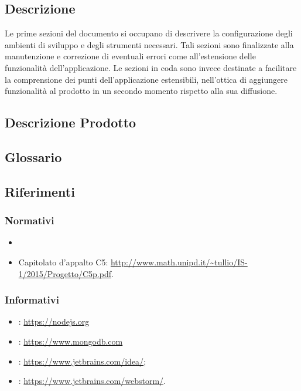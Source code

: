 \documentclass[12pt,a4paper]{article}
\begin{document}
	\subsection{Descrizione}
	Le prime sezioni del documento si occupano di descrivere la configurazione degli ambienti di sviluppo e degli strumenti necessari. Tali sezioni sono finalizzate alla manutenzione e correzione di eventuali errori come all'estensione delle funzionalità dell'applicazione. Le sezioni in coda sono invece destinate a facilitare la comprensione dei punti dell'applicazione estensibili, nell'ottica di aggiungere funzionalità al prodotto in un secondo momento rispetto alla sua diffusione.
	
	\subsection{Descrizione Prodotto}
	\descrizioneProdotto
	
	\subsection{Glossario}
	\glossarioPrint
	
	\subsection{Riferimenti}
	\subsubsection{Normativi}
	\begin{itemize}
		\item \NdPv\;
		\item Capitolato d'appalto C5: \url{http://www.math.unipd.it/~tullio/IS-1/2015/Progetto/C5p.pdf}.
	\end{itemize}
	\subsubsection{Informativi}
	\begin{itemize}
		\item {}: \url{https://nodejs.org}  
		\item {}: \url{https://www.mongodb.com}
		\item {} :  \url{https://www.jetbrains.com/idea/};
		\item {} : \url{https://www.jetbrains.com/webstorm/}.
	\end{itemize}
		
\end{document}

